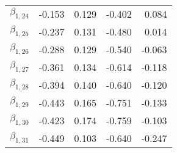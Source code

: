 \begin{tabular}{lrrrr}
$\beta_{1,24}$ & -0.153 &     0.129 &   -0.402 &     0.084 \\
$\beta_{1,25}$ & -0.237 &     0.131 &   -0.480 &     0.014 \\
$\beta_{1,26}$ & -0.288 &     0.129 &   -0.540 &    -0.063 \\
$\beta_{1,27}$ & -0.361 &     0.134 &   -0.614 &    -0.118 \\
$\beta_{1,28}$ & -0.394 &     0.140 &   -0.640 &    -0.120 \\
$\beta_{1,29}$ & -0.443 &     0.165 &   -0.751 &    -0.133 \\
$\beta_{1,30}$ & -0.423 &     0.174 &   -0.759 &    -0.103 \\
$\beta_{1,31}$ & -0.449 &     0.103 &   -0.640 &    -0.247 \\
\bottomrule
\end{tabular}
